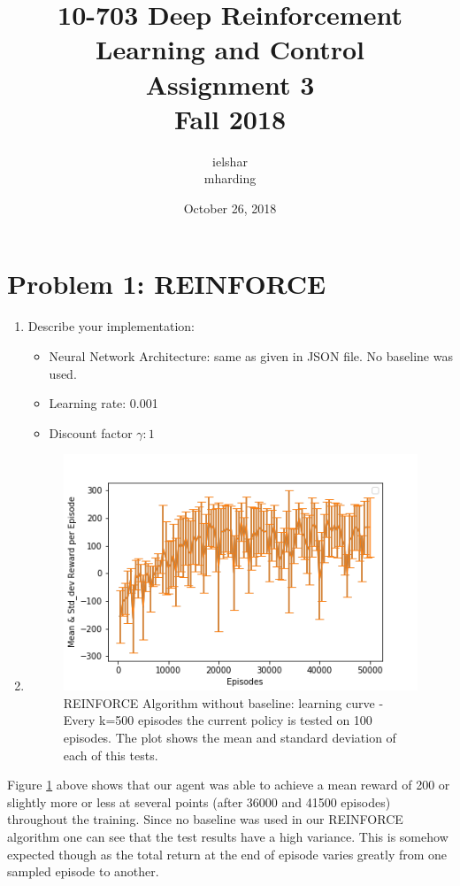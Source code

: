 \documentclass[12pt]{article}
\title{10-703 Deep Reinforcement Learning and Control\\
	Assignment 3\\
	Fall 2018 \\  
}
\author{ielshar \\ mharding}
\date{October 26, 2018}
\begin{document}
	
	\maketitle
	
	\section*{Problem 1: REINFORCE}
	\begin{enumerate}
		\item  Describe your implementation:
		\begin{itemize}
			\item Neural Network Architecture:  same as given in JSON file. No baseline was used.
			\item Learning rate: 0.001
			\item Discount factor $\gamma: 1$
		\end{itemize}
		\item 
		\begin{figure}[H]
			\begin{center} 
				\includegraphics[scale=.73]{figures/Reinforce_LC_50.png}
			\end{center}
			\caption{REINFORCE Algorithm without baseline: learning curve - Every k=500 episodes the current policy is tested on 100 episodes. The plot shows the mean and standard deviation of each of this tests.  } 	\label{1}%
		\end{figure}
	\end{enumerate}
	
	Figure \ref{1} above shows that our agent was able to achieve a mean reward of 200  or slightly more or less at several points (after 36000 and 41500 episodes) throughout the training. Since no baseline was used in our REINFORCE algorithm one can see that the test results have a high variance. This is somehow expected though as the total return at the end of episode varies greatly from one sampled episode to another.
	
\end{document}
